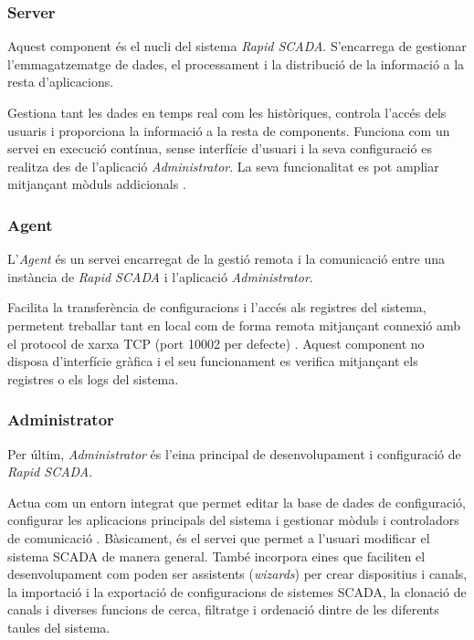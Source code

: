 \documentclass[a4paper,11pt,DIV=13,headings=normal,abstract=true,twoside=semi]{article}
\newcommand{\acro}[1]{\textsc{#1}}
\begin{document}
\subsubsection*{Server}

Aquest component és el nucli del sistema \emph{Rapid SCADA}. S'encarrega de gestionar l'emmagatzematge de dades, el processament i la distribució de la informació a la resta d'aplicacions.

Gestiona tant les dades en temps real com les històriques, controla l'accés dels usuaris i proporciona la informació a la resta de components. Funciona com un servei en execució contínua, sense interfície d'usuari i la seva configuració es realitza des de l'aplicació \emph{Administrator}. La seva funcionalitat es pot ampliar mitjançant mòduls addicionals \cite{rapidscada_apps}.


\subsubsection*{Agent}

L'\emph{Agent} és un servei encarregat de la gestió remota i la comunicació entre una instància de \emph{Rapid SCADA} i l'aplicació \emph{Administrator}.

Facilita la transferència de configuracions i l'accés als registres del sistema, permetent treballar tant en local com de forma remota mitjançant connexió amb el protocol de xarxa \acro{TCP} (port 10002 per defecte) \cite{rapidscada_apps}. Aquest component no disposa d'interfície gràfica i el seu funcionament es verifica mitjançant els registres o els logs del sistema.

\subsubsection*{Administrator}

Per últim, \emph{Administrator} és l'eina principal de desenvolupament i configuració de \emph{Rapid SCADA}. 

Actua com un entorn integrat que permet editar la base de dades de configuració, configurar les aplicacions principals del sistema i gestionar mòduls i controladors de comunicació \cite{rapidscada_apps}. Bàsicament, és el servei que permet a l'usuari modificar el sistema \acro{SCADA} de manera general. També incorpora eines que faciliten el desenvolupament com poden ser assistents (\emph{wizards}) per crear dispositius i canals, la importació i la exportació de configuracions de sistemes \acro{SCADA}, la clonació de canals i diverses funcions de cerca, filtratge i ordenació dintre de les diferents taules del sistema. 
\end{document}
